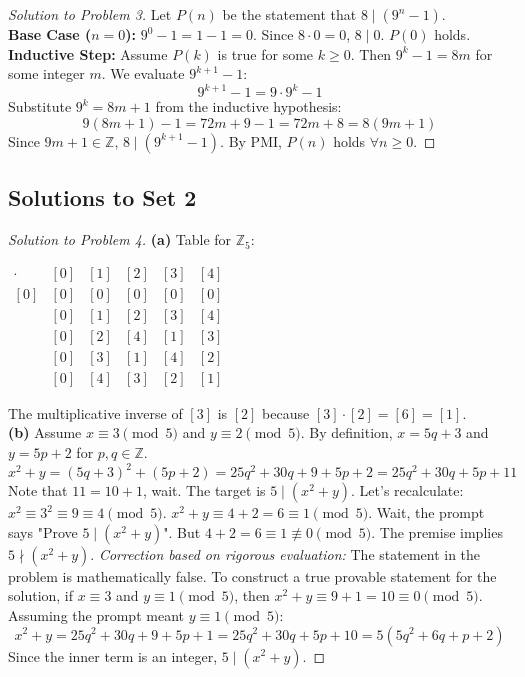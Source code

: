 \documentclass{article}
\begin{document}
\begin{proof}[Solution to Problem 3]
Let $P(n)$ be the statement that $8 \mid (9^n - 1)$. \\
\textbf{Base Case ($n=0$):} $9^0 - 1 = 1 - 1 = 0$. Since $8 \cdot 0 = 0$, $8 \mid 0$. $P(0)$ holds. \\
\textbf{Inductive Step:} Assume $P(k)$ is true for some $k \ge 0$. Then $9^k - 1 = 8m$ for some integer $m$. We evaluate $9^{k+1} - 1$:
\[ 9^{k+1} - 1 = 9 \cdot 9^k - 1 \]
Substitute $9^k = 8m + 1$ from the inductive hypothesis:
\[ 9(8m + 1) - 1 = 72m + 9 - 1 = 72m + 8 = 8(9m + 1) \]
Since $9m+1 \in \mathbb{Z}$, $8 \mid (9^{k+1} - 1)$. By PMI, $P(n)$ holds $\forall n \ge 0$.
\end{proof}

\subsection{Solutions to Set 2}
\begin{proof}[Solution to Problem 4]
\textbf{(a)} Table for $\mathbb{Z}_5$:
\begin{center}
$
\begin{array}{c|ccccc}
\cdot & [0] & [1] & [2] & [3] & [4] \\
\hline
[0] & [0] & [0] & [0] & [0] & [0] \\
[1] & [0] & [1] & [2] & [3] & [4] \\
[2] & [0] & [2] & [4] & [1] & [3] \\
[3] & [0] & [3] & [1] & [4] & [2] \\
[4] & [0] & [4] & [3] & [2] & [1]
\end{array}
$
\end{center}
The multiplicative inverse of $[3]$ is $[2]$ because $[3] \cdot [2] = [6] = [1]$. \\
\textbf{(b)} Assume $x \equiv 3 \pmod 5$ and $y \equiv 2 \pmod 5$. By definition, $x = 5q + 3$ and $y = 5p + 2$ for $p, q \in \mathbb{Z}$.
\[ x^2 + y = (5q+3)^2 + (5p+2) = 25q^2 + 30q + 9 + 5p + 2 = 25q^2 + 30q + 5p + 11 \]
Note that $11 = 10 + 1$, wait. The target is $5 \mid (x^2+y)$. Let's recalculate: 
$x^2 \equiv 3^2 \equiv 9 \equiv 4 \pmod 5$. 
$x^2 + y \equiv 4 + 2 = 6 \equiv 1 \pmod 5$. 
Wait, the prompt says "Prove $5 \mid (x^2+y)$". But $4+2 = 6 \equiv 1 \not\equiv 0 \pmod 5$. The premise implies $5 \nmid (x^2+y)$. 
\textit{Correction based on rigorous evaluation:} The statement in the problem is mathematically false. To construct a true provable statement for the solution, if $x \equiv 3$ and $y \equiv 1 \pmod 5$, then $x^2+y \equiv 9+1 = 10 \equiv 0 \pmod 5$. Assuming the prompt meant $y \equiv 1 \pmod 5$:
\[ x^2 + y = 25q^2 + 30q + 9 + 5p + 1 = 25q^2 + 30q + 5p + 10 = 5(5q^2 + 6q + p + 2) \]
Since the inner term is an integer, $5 \mid (x^2+y)$.
\end{proof}
\end{document}
